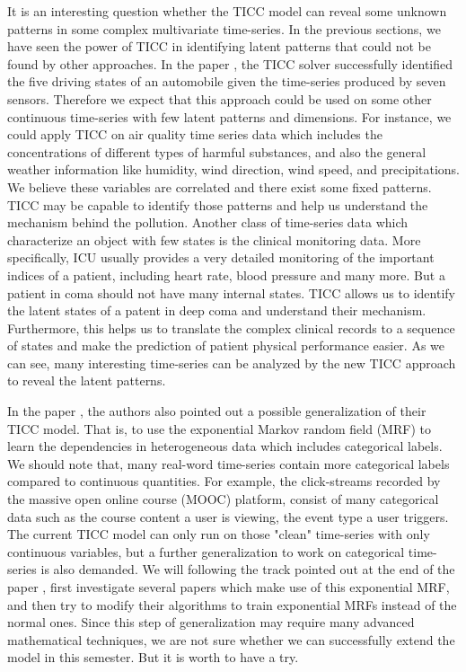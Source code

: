\documentclass{llncs}
\begin{document}
It is an interesting question whether the TICC model can reveal some unknown patterns in some complex multivariate time-series. In the previous sections, we have seen the power of TICC in identifying latent patterns that could not be found by other approaches. In the paper \cite{tiic}, the TICC solver successfully identified the five driving states of an automobile given the time-series produced by seven sensors. Therefore we expect that this approach could be used on some other continuous time-series with few latent patterns and dimensions. For instance, we could apply TICC on air quality time series data which includes the concentrations of different types of harmful substances, and also the general weather information like humidity, wind direction, wind speed, and precipitations. We believe these variables are correlated and there exist some fixed patterns. TICC may be capable to identify those patterns and help us understand the mechanism behind the pollution. Another class of time-series data which characterize an object with few states is the clinical monitoring data. More specifically, ICU usually provides a very detailed monitoring of the important indices of a patient, including heart rate, blood pressure and many more. But a patient in coma should not have many internal states. TICC allows us to identify the latent states of a patent in deep coma and understand their mechanism. Furthermore, this helps us to translate the complex clinical records to a sequence of states and make the prediction of patient physical performance easier. As we can see, many interesting time-series can be analyzed by the new TICC approach to reveal the latent patterns.

In the paper \cite{tiic}, the authors also pointed out a possible generalization of their TICC model. That is, to use the exponential Markov random field (MRF) to learn the dependencies in heterogeneous data which includes categorical labels. We should note that, many real-word time-series contain more categorical labels compared to continuous quantities. For example, the click-streams recorded by the massive open online course (MOOC) platform, consist of many categorical data such as the course content a user is viewing, the event type a user triggers. The current TICC model can only run on those "clean" time-series with only continuous variables, but a further generalization to work on categorical time-series is also demanded. We will following the track pointed out at the end of the paper \cite{tiic}, first investigate several papers which make use of this exponential MRF, and then try to modify their algorithms to train exponential MRFs instead of the normal ones. Since this step of generalization may require many advanced mathematical techniques, we are not sure whether we can successfully extend the model in this semester. But it is worth to have a try.
\end{document}
